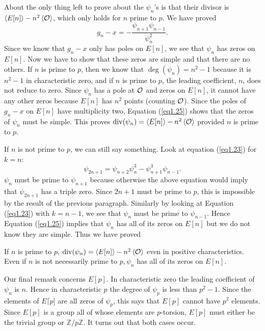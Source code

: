About the only thing left to prove about the $\psi_{n}$'s is that their divisor is $\left\langle E[n] \right \rangle-n^{2}\left\langle \mathcal{O} \right \rangle$, which only holds for $n$ prime to $p$. We have proved
\begin{equation}
\label{eq1.28}
g_{n}-x=-\displaystyle \frac{\psi_{n+1}\psi_{n-1}}{\psi_{n}^{2}} .
\end{equation}
Since we know that $g_{n}-x$ only has poles on $E[n]$, we see that $\psi_{n}$ has zeros on $E[n]$. Now we have to show that these zeros are simple and that there are no others. If $n$ is prime to $p$, then we know that $\deg(\psi_{n})=n^{2}-1$ because it is $n^{2}-1$ in characteristic zero, and if $n$ is prime to $p$, the leading coefficient, $n$, does not reduce to zero. Since $\psi_{n}$ has a pole at $\mathcal{O}$ and zeros on $E[n]$, it cannot have any other zeros because $E[n]$ has $n^{2}$ points (counting $\mathcal{O}$). Since the poles of $g_{n}-x$ on $E[n]$ have multiplicity two, Equation (\ref{eq1.25}) shows that the zeros of $\psi_{n}$ must be simple. This proves $\operatorname{div}(\psi_{n})=\left\langle E[n] \right \rangle-n^{2}\left\langle \mathcal{O} \right \rangle$ provided $n$ is prime to $p$.

If $n$ is not prime to $p$, we can still say something. Look at equation (\ref{eq1.23}) for $k=n$:
\begin{equation}
\label{eq1.29}
\psi_{2n+1}=\psi_{n+2}\psi_{n}^{3}-\psi_{n+1}^{3}\psi_{n-1} .
\end{equation}
$\psi_{n}$ must be prime to $\psi_{n+1}$ because otherwise the above equation would imply that $\psi_{2n+1}$ has a triple zero. Since $2n+1$ must be prime to $p$, this is impossible by the result of the previous paragraph. Similarly by looking at Equation (\ref{eq1.23}) with $k=n-1$, we see that $\psi_{n}$ must be prime to $\psi_{n-1}$. Hence Equation (\ref{eq1.25}) implies that $\psi_{n}$ has all of its zeros on $E[n]$ but we do not know they are simple. Thus we have proved

\begin{prop}
\label{p9.10}
If $n$ is prime to $p$,  $\operatorname{div}(\psi_{n})=\left\langle E[n] \right \rangle-n^{2}\left\langle \mathcal{O} \right \rangle$ even in positive characteristics. Even if $n$ is not necessarily prime to $p,\psi_{n}$ has all of its zeros on $E[n]$.
\end{prop}

\rem
Our final remark concerns $E[p]$. In characteristic zero the leading coefficient of $\psi_{n}$ is $n$. Hence in characteristic $p$ the degree of $\psi_{p}$ is less than $p^{2}-1$. Since the elements of $E\lceil p]$ are all zeros of $\psi_{p}$, this says that $E[p]$ cannot have $p^{2}$ elements. Since $E[p]$ is a group all of whose elements are $p$-torsion, $E[p]$ must either be the trivial group or $\mathbb{Z}/p\mathbb{Z}$. It turns out that both cases occur.

